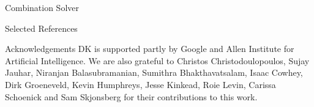 \documentclass[final]{beamer}
\newlength{\onecolwid}
\begin{document}
\begin{frame}[t]
\begin{columns}[t]
\begin{column}{\onecolwid}
\begin{block}{Combination Solver}
\end{block}


\begin{block}{Selected References}

\nocite{*} 
\small{
\vspace{0.75in}}

\end{block}


\vspace{-2	cm}

\begin{block}{Acknowledgements}
	\footnotesize{
	DK is supported partly by Google and Allen Institute for Artificial Intelligence.  
	We are also grateful to Christos Christodoulopoulos, Sujay Jauhar, Niranjan Balasubramanian, Sumithra Bhakthavatsalam, Isaac Cowhey, Dirk
	Groeneveld, Kevin Humphreys, Jesse Kinkead, Roie Levin,
	Carissa Schoenick and Sam Skjonsberg for their contributions to this work. 
	}
\end{block}

\end{column} %

\end{columns} %

\end{frame} %
\end{document}
